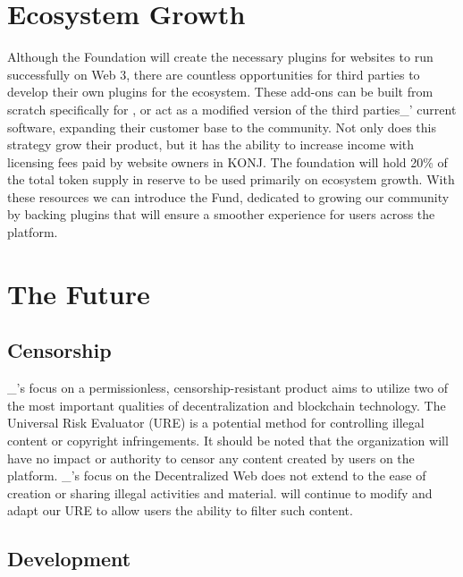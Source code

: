 \documentclass{kwp-builder}
\begin{document}

\section{Ecosystem Growth}

\tab Although the \konjure Foundation will create the necessary plugins for websites to run successfully on Web 3, there are countless opportunities for third parties to develop their own plugins for the ecosystem. These add-ons can be built from scratch specifically for \konjure, or act as a modified version of the third parties\_{’} current software, expanding their customer base to the \konjure community. Not only does this strategy grow their product, but it has the ability to increase income with licensing fees paid by website owners in KONJ. The foundation will hold 20\% of the total token supply in reserve to be used primarily on ecosystem growth. With these resources we can introduce the \konjure Fund, dedicated to growing our community by backing plugins that will ensure a smoother experience for users across the platform.


\newpage

\section{The Future}
\subsection{Censorship}

\tab \konjure\_{’}s focus on a permissionless, censorship-resistant product aims to utilize two of the most important qualities of decentralization and blockchain technology. The Universal Risk Evaluator (URE) is a potential method for controlling illegal content or copyright infringements. It should be noted that the \konjure organization will have no impact or authority to censor any content created by users on the platform. \konjure\_{’}s focus on the Decentralized Web does not extend to the ease of creation or sharing illegal activities and material. \konjure will continue to modify and adapt our URE to allow users the ability to filter such content.

\subsection{Development}
\end{document}

